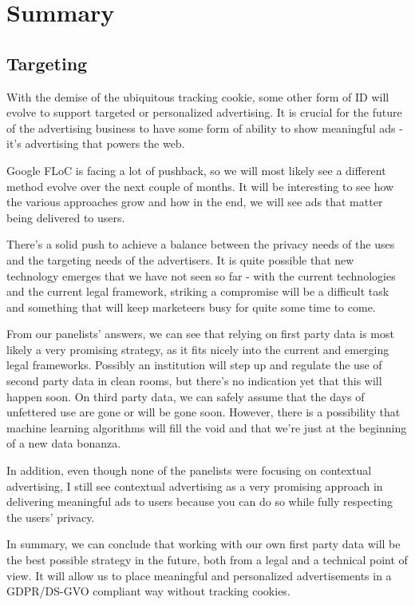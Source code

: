 %
%

\pagebreak
\section{Summary}

\onehalfspacing

\subsection{Targeting}

With the demise of the ubiquitous tracking cookie, some other form of ID will evolve to support targeted or personalized advertising. It is crucial for the future of the advertising business to have some form of ability to show meaningful ads - it's advertising that powers the web.

Google FLoC is facing a lot of pushback, so we will most likely see a different method evolve over the next couple of months. It will be interesting to see how the various approaches grow and how in the end, we will see ads that matter being delivered to users.

There's a solid push to achieve a balance between the privacy needs of the uses and the targeting needs of the advertisers. It is quite possible that new technology emerges that we have not seen so far - with the current technologies and the current legal framework, striking a compromise will be a difficult task and something that will keep marketeers busy for quite some time to come.

From our panelists' answers, we can see that relying on first party data is most likely a very promising strategy, as it fits nicely into the current and emerging legal frameworks. Possibly an institution will step up and regulate the use of second party data in clean rooms, but there's no indication yet that this will happen soon. On third party data, we can safely assume that the days of unfettered use are gone or will be gone soon. However, there is a possibility that machine learning algorithms will fill the void and that we're just at the beginning of a new data bonanza.

In addition, even though none of the panelists were focusing on contextual advertising, I still see contextual advertising as a very promising approach in delivering meaningful ads to users because you can do so while fully respecting the users' privacy.

In summary, we can conclude that working with our own first party data will be the best possible strategy in the future, both from a legal and a technical point of view. It will allow us to place meaningful and personalized advertisements in a GDPR/DS-GVO compliant way without tracking cookies.

